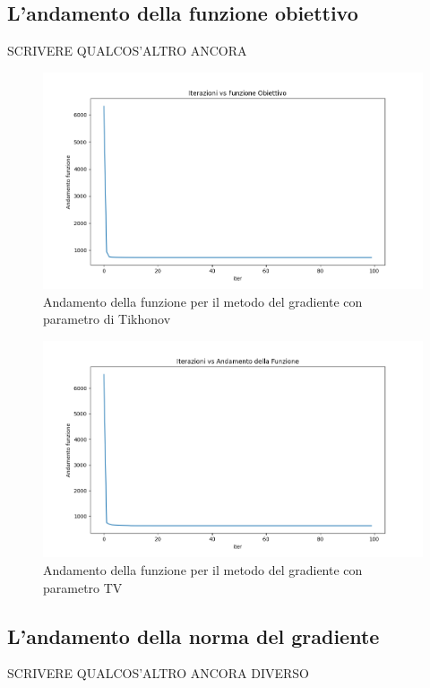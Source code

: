 \documentclass[12pt]{article}
\begin{document}
    \newpage
    \subsection{L'andamento della funzione obiettivo}
    SCRIVERE QUALCOS'ALTRO ANCORA
    
    \begin{figure}[h!]
    \centering
    \includegraphics[width=15cm]{fun}
    \caption{Andamento della funzione per il metodo del gradiente con parametro di Tikhonov}
    \label{graph:1}
    \end{figure}
    
    \begin{figure}[h!]
    \centering
    \includegraphics[width=15cm]{fun_totvar}
    \caption{Andamento della funzione per il metodo del gradiente con parametro TV}
    \label{graph:2}
    \end{figure}

    \newpage
    \subsection{L'andamento della norma del gradiente}
    SCRIVERE QUALCOS'ALTRO ANCORA DIVERSO
    
\end{document}
